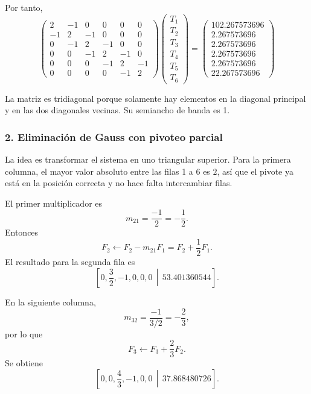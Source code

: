 \documentclass[11pt,a4paper]{article}
\begin{document}
Por tanto,
\begin{equation}
\boxed{
\begin{pmatrix}
2&-1&0&0&0&0\\
-1&2&-1&0&0&0\\
0&-1&2&-1&0&0\\
0&0&-1&2&-1&0\\
0&0&0&-1&2&-1\\
0&0&0&0&-1&2
\end{pmatrix}
\begin{pmatrix}T_1\\T_2\\T_3\\T_4\\T_5\\T_6\end{pmatrix}
=
\begin{pmatrix}
102.267573696\\
2.267573696\\
2.267573696\\
2.267573696\\
2.267573696\\
22.267573696
\end{pmatrix}}
\end{equation}

La matriz es tridiagonal porque solamente hay elementos en la diagonal principal y en las dos diagonales vecinas. Su semiancho de banda es 1.

\subsubsection*{2. Eliminación de Gauss con pivoteo parcial}

La idea es transformar el sistema en uno triangular superior. Para la primera columna, el mayor valor absoluto entre las filas 1 a 6 es $2$, así que el pivote ya está en la posición correcta y no hace falta intercambiar filas.

El primer multiplicador es
\[
m_{21}=\frac{-1}{2}=-\frac12.
\]
Entonces
\[
F_2\leftarrow F_2-m_{21}F_1=F_2+\frac12F_1.
\]
El resultado para la segunda fila es
\[
\left[0,\frac32,-1,0,0,0\,\middle|\,53.401360544\right].
\]

En la siguiente columna,
\[
m_{32}=\frac{-1}{3/2}=-\frac23,
\]
por lo que
\[
F_3\leftarrow F_3+\frac23F_2.
\]
Se obtiene
\[
\left[0,0,\frac43,-1,0,0\,\middle|\,37.868480726\right].
\]
\end{document}
